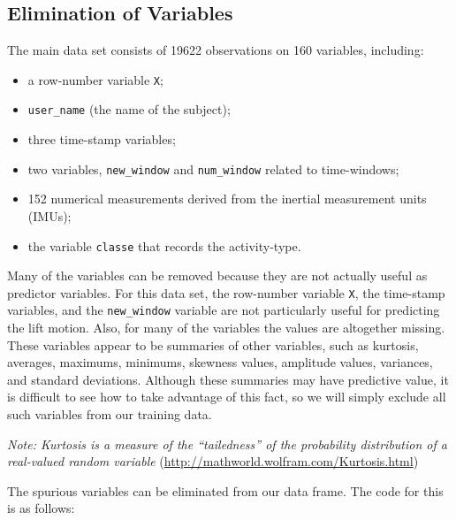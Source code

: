 \documentclass[12pt,twoside]{reedthesis}
\providecommand{\tightlist}{%
  \setlength{\itemsep}{0pt}\setlength{\parskip}{0pt}}
\begin{document}
  \subsection{Elimination of Variables}\label{elimination-of-variables}
  
  The main data set consists of 19622 observations on 160 variables,
  including:
  
  \begin{itemize}
  \tightlist
  \item
    a row-number variable \texttt{X};
  \item
    \texttt{user\_name} (the name of the subject);
  \item
    three time-stamp variables;
  \item
    two variables, \texttt{new\_window} and \texttt{num\_window} related
    to time-windows;
  \item
    152 numerical measurements derived from the inertial measurement units
    (IMUs);
  \item
    the variable \texttt{classe} that records the activity-type.
  \end{itemize}
  
  Many of the variables can be removed because they are not actually
  useful as predictor variables. For this data set, the row-number
  variable \texttt{X}, the time-stamp variables, and the
  \texttt{new\_window} variable are not particularly useful for predicting
  the lift motion. Also, for many of the variables the values are
  altogether missing. These variables appear to be summaries of other
  variables, such as kurtosis, averages, maximums, minimums, skewness
  values, amplitude values, variances, and standard deviations. Although
  these summaries may have predictive value, it is difficult to see how to
  take advantage of this fact, so we will simply exclude all such
  variables from our training data.
  
  \emph{Note: Kurtosis is a measure of the ``tailedness'' of the
  probability distribution of a real-valued random variable}
  (\url{http://mathworld.wolfram.com/Kurtosis.html})
  
  \newpage
  
  The spurious variables can be eliminated from our data frame. The code
  for this is as follows:
  
\end{document}
